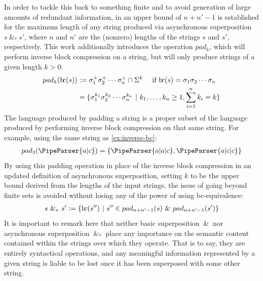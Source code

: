 \documentclass[a4paper,12pt,leqno,twoside]{article}
\newcommand{\bc}{{\rm b\!c}}
\newcommand{\vph}[1]{\vphantom{#1}}
\newcommand{\ebox}[1]{\fbox{$\vph{'(),}#1$}}
\renewcommand{\sp}{~\&~}
\newcommand{\spasync}{~\&_*~}
\newcommand{\EventString}[1]{%
	\renewcommand*{\do}[1]{\ebox{##1}}%
	\PipeParser{#1}%
}
\begin{document}
In order to tackle this back to something finite and to avoid generation of large amounts of redundant information, in \citet[p. 127]{woods2017towards} an upper bound of $n + n' - 1$\label{def:sp-upper-bound-length} is established for the maximum length of any string produced via asynchronous superposition $s \spasync s'$, where $n$ and $n'$ are the (nonzero) lengths of the strings $s$ and $s'$, respectively. This work additionally introduces the operation $pad_k$, which will perform inverse block compression on a string, but will only produce strings of a given length $k > 0$:
\begin{align}\label{def:padk}
	pad_k(\bc(s)) &:= \sigma_1^+ \sigma_2^+ \cdots \sigma_n^+ \cap \Sigma^k ~~~ \mbox{ if } \bc(s) = \sigma_1 \sigma_2 \cdots \sigma_n\\
	&=\{\sigma_1^{k_1}\sigma_2^{k_2}\cdots\sigma_n^{k_n} ~|~ k_1,\ldots,k_n \ge 1, \sum_{i = 1}^{n}k_i = k  \}\notag
\end{align}
The language produced by padding a string is a proper subset of the language produced by performing inverse block compression on that same string. For example, using the same string as \cref{ex:inverse-bc}:
\begin{align}\label{ex:padk}
	pad_3(\EventString{a|c}) = \{\EventString{a|a|c}, \EventString{a|c|c}\}
\end{align}
By using this padding operation in place of the inverse block compression in an updated definition of asynchronous superposition, setting $k$ to be the upper bound derived from the lengths of the input strings, the issue of going beyond finite sets is avoided without losing any of the power of using \bc-equivalence:
\begin{align}\label{def:async-superposition}
	s \spasync s' := \{\bc(s'') ~|~ s'' \in pad_{n+n'-1}(s) \sp pad_{n+n'-1}(s')\}
\end{align}\index{Superposition!Asynchronous $\spasync$}
It is important to remark here that neither basic superposition $\sp$ nor asynchronous superposition $\spasync$ place any importance on the semantic content contained within the strings over which they operate. That is to say, they are entirely syntactical operations, and any meaningful information represented by a given string is liable to be lost once it has been superposed with some other string.
\end{document}
